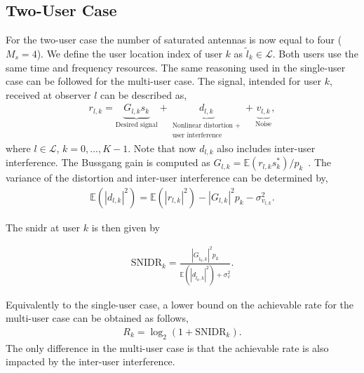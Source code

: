 \documentclass[conference]{IEEEtran}
\begin{document}
\subsection{Two-User Case}
For the two-user case the number of saturated antennas is now equal to four ($M_s=4$). We define the user location index of user $k$ as $\tilde{l}_k \in \mathcal{L}$. Both users use the same time and frequency resources. The same reasoning used in the single-user case can be followed for the multi-user case. The signal, intended for user $k$, received at observer $l$ can be described as,
\begin{align}\label{eq:busgang-multi-user}
    r_{l,k} = \underbrace{G_{l,k}  s_k}_\text{Desired signal} + \underbrace{d_{l,k}}_{\substack{\text{Nonlinear distortion +} \\ \text{user interference}}} + \underbrace{v_{l,k}}_{\text{Noise}},
\end{align}
where $l\in \mathcal{L}$, $k=0,...,K-1$. Note that now $d_{l,k}$ also includes inter-user interference. The Bussgang gain is computed as  $G_{l,k}=\mathbb{E}\left(r_{l,k} s_k^{*}\right) / p_k$~\cite{demir2020bussgang}. The variance of the distortion and inter-user interference can be determined by,
\begin{align}\label{eq:distortion-multi-user}
\mathbb{E}\left(|d_{l,k} |^{2}\right)=\mathbb{E}\left(|r_{l,k} |^{2}\right)-|G_{l,k} |^{2} p_k-\sigma_{v_{l,k}}^{2}.
\end{align}

The \gls{snidr} at user $k$ is then given by 

\begin{align}\label{eq:snidr_k}
\mathrm{SNIDR}_k = \frac{|G_{\tilde{l}_k,k} |^{2} p_k}{\mathbb{E}\left(|d_{\tilde{l}_k,k}|^{2}\right)+\sigma_{v}^{2}}.
\end{align}


Equivalently to the single-user case, a lower bound on the achievable rate for the multi-user case can be obtained as follows, 
\begin{align}\label{eq:R-multi-user}
R_k = \log_2(1+\mathrm{SNIDR}_k).
\end{align}
The only difference in the multi-user case is that the achievable rate is also impacted by the inter-user interference.
\end{document}
